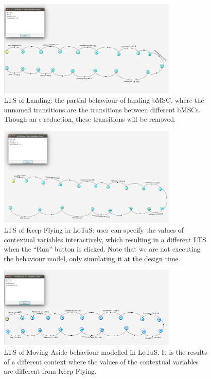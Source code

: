 \begin{figure}
 \includegraphics[width=0.8\textwidth]{figures/4-Land-final-LTS.png}
    \caption{LTS of Landing: the partial behaviour of landing bMSC, where the unnamed transitions are the transitions between different bMSCs. Though an $\epsilon$-reduction, these transitions will be removed.}
    \label{fig:landing}
    \vspace*{-0.25cm}
\end{figure}

\begin{figure}
 \includegraphics[width=0.8\textwidth]{figures/5-KeepFlying-final-LTS.png}
    \caption{LTS of Keep Flying in LoTuS: user can specify the values of contextual variables interactively, which resulting in a different LTS when the ``Run'' button is clicked. Note that we are not executing the behaviour model, only simulating it at the design time.}
    \label{fig:keepflying}
    \vspace*{-0.25cm}
\end{figure}

\begin{figure}
 \includegraphics[width=0.8\textwidth]{figures/6-MoveAside-final-LTS.png}
    \caption{LTS of Moving Aside behaviour modelled in LoTuS. It is the results of a different context where the values of the contextual variables are different from Keep Flying.}
    \label{fig:movingaside}
    \vspace*{-0.25cm}
\end{figure}


